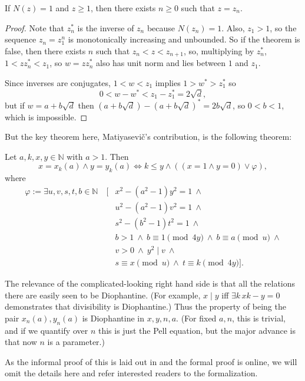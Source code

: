 \documentclass{llncs}
\newcommand{\N}{\mathbb{N}}
\begin{document}
\begin{theorem}
If $N(z)=1$ and $z\ge 1$, then there exists $n\ge 0$ such that $z=z_n$.
\end{theorem}
\begin{proof}
Note that $z_n^*$ is the inverse of $z_n$ because $N(z_n)=1$. Also, $z_1>1$, so the sequence $z_n=z_1^n$ is monotonically increasing and unbounded. So if the theorem is false, then there exists $n$ such that $z_n<z<z_{n+1}$, so, multiplying by $z_n^*$, $1<zz_n^*<z_1$, so $w=zz_n^*$ also has unit norm and lies between $1$ and $z_1$.

Since inverses are conjugates, $1<w<z_1$ implies $1>w^*>z_1^*$ so $$0<w-w^*<z_1-z_1^*=2\sqrt d,$$
but if $w=a+b\sqrt d$ then $(a+b\sqrt d)-(a+b\sqrt d)^*=2b\sqrt d$, so $0<b<1$, which is impossible.
\end{proof}

But the key theorem here, Matiyasevi\v{c}'s contribution, is the following theorem:

\begin{theorem}\label{pell_dioph}
Let $a,k,x,y\in \N$ with $a>1$. Then 
$$x=x_k(a)\wedge y=y_k(a)\iff k\le y\land ((x=1\land y=0)\lor\varphi),$$
where
\begin{align*}
\varphi:=\exists u,v,s,t,b\in\N\quad
[&x^2-(a^2-1)y^2=1\ \wedge\\
&u^2-(a^2-1)v^2=1\ \wedge\\
&s^2-(b^2-1)t^2=1\ \wedge\\
&b>1\ \wedge\ b\equiv 1\pmod{4y}\ \wedge\ b\equiv a\pmod u\ \wedge\\
&v>0\ \wedge\ y^2\mid v\ \wedge\\
&s\equiv x\pmod u\ \wedge\ t\equiv k\pmod {4y}].
\end{align*}
\end{theorem}
The relevance of the complicated-looking right hand side is that all the relations there are easily seen to be Diophantine. (For example, $x\mid y$ iff $\exists k\,xk-y=0$ demonstrates that divisibility is Diophantine.) Thus the property of being the pair $x_n(a),y_n(a)$ is Diophantine in $x,y,n,a$. (For fixed $a,n$, this is trivial, and if we quantify over $n$ this is just the Pell equation, but the major advance is that now $n$ is a parameter.)

As the informal proof of this is laid out in \cite{davis} and the formal proof is online, we will omit the details here and refer interested readers to the formalization.
%
\end{document}
